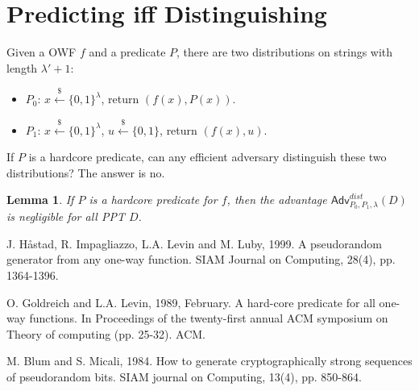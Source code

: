 \documentclass[12pt]{article}
\newcommand{\bits}{\{0,1\}}
\newcommand{\getsr}{\stackrel{\$}{\gets}}
\newcommand{\Adv}{\textsf{Adv}}
\newtheorem{lemma}[theorem]{Lemma}
\theoremstyle{definition}
\begin{document}
\section{Predicting iff Distinguishing}
Given a OWF $f$ and a predicate $P$, there are two distributions on strings with length $\lambda' + 1$:
\begin{itemize}
\item $P_0$: $x \getsr \bits^\lambda$, return $(f(x), P(x))$.
\item $P_1$: $x \getsr \bits^\lambda$, $u \getsr \bits$, return $(f(x), u)$.
\end{itemize}
If $P$ is a hardcore predicate, can any efficient adversary distinguish these two distributions? The answer is no.
\begin{lemma}
If $P$ is a hardcore predicate for $f$, then the advantage $\Adv_{P_0,P_1,\lambda}^{dist}(D)$ is negligible for all PPT $D$.
\end{lemma}

\begin{thebibliography}{10}
J. H\aa stad, R. Impagliazzo, L.A. Levin and M. Luby, 1999. 
A pseudorandom generator from any one-way function. 
SIAM Journal on Computing, 28(4), pp. 1364-1396.
	
O. Goldreich and L.A. Levin, 1989, February. 
A hard-core predicate for all one-way functions. 
In Proceedings of the twenty-first annual ACM symposium on Theory of computing (pp. 25-32). ACM.

M. Blum and S. Micali, 1984. 
How to generate cryptographically strong sequences of pseudorandom bits. 
SIAM journal on Computing, 13(4), pp. 850-864.
\end{thebibliography}
\end{document}
